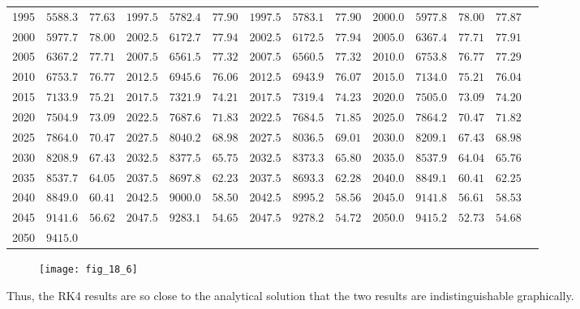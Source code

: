 \documentclass[../main.tex]{subfiles}
\begin{document}
\begin{enumerate}[label=\bfseries(\alph*)]
\begin{tabular}{cccccccccccccc}
1995 & $5588.3$ & $77.63$ & $1997.5$ & $5782.4$ & $77.90$ & $1997.5$ & $5783.1$ & $77.90$ & $2000.0$ & $5977.8$ & $78.00$ & $77.87$ \\
2000 & $5977.7$ & $78.00$ & $2002.5$ & $6172.7$ & $77.94$ & $2002.5$ & $6172.5$ & $77.94$ & $2005.0$ & $6367.4$ & $77.71$ & $77.91$ \\
2005 & $6367.2$ & $77.71$ & $2007.5$ & $6561.5$ & $77.32$ & $2007.5$ & $6560.5$ & $77.32$ & $2010.0$ & $6753.8$ & $76.77$ & $77.29$ \\
2010 & $6753.7$ & $76.77$ & $2012.5$ & $6945.6$ & $76.06$ & $2012.5$ & $6943.9$ & $76.07$ & $2015.0$ & $7134.0$ & $75.21$ & $76.04$ \\
2015 & $7133.9$ & $75.21$ & $2017.5$ & $7321.9$ & $74.21$ & $2017.5$ & $7319.4$ & $74.23$ & $2020.0$ & $7505.0$ & $73.09$ & $74.20$ \\
2020 & $7504.9$ & $73.09$ & $2022.5$ & $7687.6$ & $71.83$ & $2022.5$ & $7684.5$ & $71.85$ & $2025.0$ & $7864.2$ & $70.47$ & $71.82$ \\
2025 & $7864.0$ & $70.47$ & $2027.5$ & $8040.2$ & $68.98$ & $2027.5$ & $8036.5$ & $69.01$ & $2030.0$ & $8209.1$ & $67.43$ & $68.98$ \\
2030 & $8208.9$ & $67.43$ & $2032.5$ & $8377.5$ & $65.75$ & $2032.5$ & $8373.3$ & $65.80$ & $2035.0$ & $8537.9$ & $64.04$ & $65.76$ \\
2035 & $8537.7$ & $64.05$ & $2037.5$ & $8697.8$ & $62.23$ & $2037.5$ & $8693.3$ & $62.28$ & $2040.0$ & $8849.1$ & $60.41$ & $62.25$ \\
2040 & $8849.0$ & $60.41$ & $2042.5$ & $9000.0$ & $58.50$ & $2042.5$ & $8995.2$ & $58.56$ & $2045.0$ & $9141.8$ & $56.61$ & $58.53$ \\
2045 & $9141.6$ & $56.62$ & $2047.5$ & $9283.1$ & $54.65$ & $2047.5$ & $9278.2$ & $54.72$ & $2050.0$ & $9415.2$ & $52.73$ & $54.68$ \\
2050 & $9415.0$ &  &  &  &  &  &  &  &  &  &  &  \\
\hline

\end{tabular}
\end{enumerate}
	\bigbreak
	\begin{figure}[H]
		\texttt{[image: fig\_18\_6]}
		\label{fig:fig_18_6}
	\end{figure}
	\bigbreak
Thus, the RK4 results are so close to the analytical solution that the two results are indistinguishable graphically.
	\bigbreak
\end{document}
